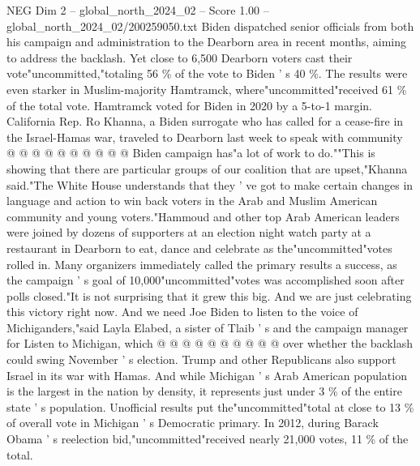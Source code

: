 \begin{textsample}{NEG Dim 2 – global\_north\_2024\_02 – Score 1.00 – global\_north\_2024\_02/200259050.txt}
Biden dispatched senior officials from both his campaign and administration to the Dearborn area in recent months, aiming to address the backlash.
Yet close to 6,500 Dearborn voters cast their vote"uncommitted,"totaling 56 \% of the vote to Biden ' s 40 \%.
The results were even starker in Muslim-majority Hamtramck, where"uncommitted"received 61 \% of the total vote.
Hamtramck voted for Biden in 2020 by a 5-to-1 margin.
California Rep.
Ro Khanna, a Biden surrogate who has called for a cease-fire in the Israel-Hamas war, traveled to Dearborn last week to speak with community @ @ @ @ @ @ @ @ @ @ Biden campaign has"a lot of work to do.""This is showing that there are particular groups of our coalition that are upset,"Khanna said."The White House understands that they ' ve got to make certain changes in language and action to win back voters in the Arab and Muslim American community and young voters."Hammoud and other top Arab American leaders were joined by dozens of supporters at an election night watch party at a restaurant in Dearborn to eat, dance and celebrate as the"uncommitted"votes rolled in.
Many organizers immediately called the primary results a success, as the campaign ' s goal of 10,000"uncommitted"votes was accomplished soon after polls closed."It is not surprising that it grew this big.
And we are just celebrating this victory right now.
And we need Joe Biden to listen to the voice of Michiganders,"said Layla Elabed, a sister of Tlaib ' s and the campaign manager for Listen to Michigan, which @ @ @ @ @ @ @ @ @ @ over whether the backlash could swing November ' s election.
Trump and other Republicans also support Israel in its war with Hamas.
And while Michigan ' s Arab American population is the largest in the nation by density, it represents just under 3 \% of the entire state ' s population.
Unofficial results put the"uncommitted"total at close to 13 \% of overall vote in Michigan ' s Democratic primary.
In 2012, during Barack Obama ' s reelection bid,"uncommitted"received nearly 21,000 votes, 11 \% of the total.

\end{textsample}

